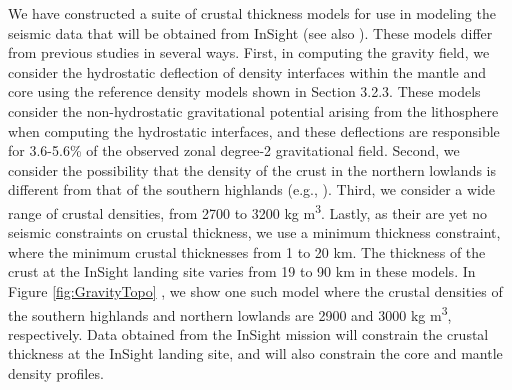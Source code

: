 We have constructed a suite of crustal thickness models for use in modeling the seismic data that will be obtained from InSight (see also \cite{Plesa2016}). These models differ from previous studies in several ways. First, in computing the gravity field, we consider the hydrostatic deflection of density interfaces within the mantle and core using the reference density models shown in Section 3.2.3. These models consider the non-hydrostatic gravitational potential arising from the lithosphere when computing the hydrostatic interfaces, and these deflections are responsible for 3.6-5.6\% of the observed zonal degree-2 gravitational field. Second, we consider the possibility that the density of the crust in the northern lowlands is different from that of the southern highlands (e.g., \cite{Belleguic2005}). Third, we consider a wide range of crustal densities, from 2700 to 3200 kg m\textsuperscript{3}. Lastly, as their are yet no seismic constraints on crustal thickness, we use a minimum thickness constraint, where the minimum crustal thicknesses from 1 to 20 km. The thickness of the crust at the InSight landing site varies from 19 to 90 km in these models. In Figure \ref{fig:GravityTopo} , we show one such model where the crustal densities of the southern highlands and northern lowlands are 2900 and 3000 kg m\textsuperscript{3}, respectively. Data obtained from the InSight mission will constrain the crustal thickness at the InSight landing site, and will also constrain the core and mantle density profiles.

